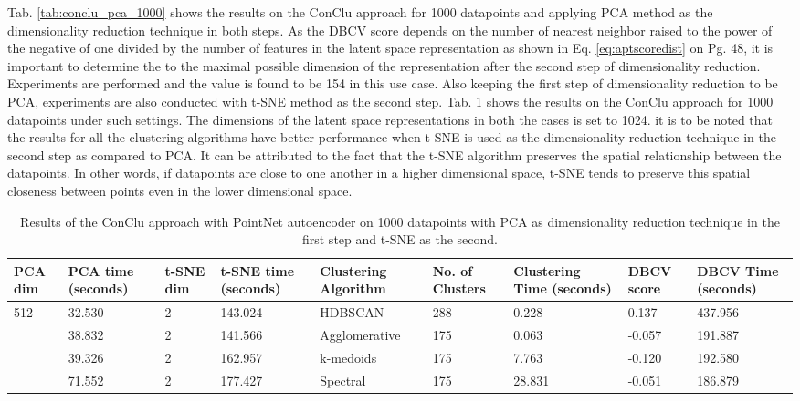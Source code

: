 Tab. \ref{tab:conclu_pca_1000} shows the results on the ConClu approach for 1000 datapoints and applying \ac{PCA} method as the dimensionality reduction technique in both steps. As the \ac{DBCV} score depends on the number of nearest neighbor raised to the power of the negative of one divided by the number of features in the latent space representation as shown in Eq. \ref{eq:aptscoredist} on Pg. 48, it is important to determine the to the maximal possible dimension of the representation after the second step of dimensionality reduction. Experiments are performed and the value is found to be 154 in this use case. Also keeping the first step of dimensionality reduction to be \ac{PCA}, experiments are also conducted with \ac{t-SNE} method as the second step. Tab. \ref{tab:conclu_tsne_1000} shows the results on the ConClu approach for 1000 datapoints under such settings. The dimensions of the latent space representations in both the cases is set to 1024. it is to be noted that the results for all the clustering algorithms have better performance when \ac{t-SNE} is used as the dimensionality reduction technique in the second step as compared to \ac{PCA}. It can be attributed to the fact that the \ac{t-SNE} algorithm preserves the spatial relationship between the datapoints. In other words, if datapoints are close to one another in a higher dimensional space, \ac{t-SNE} tends to preserve this spatial closeness between points even in the lower dimensional space. 

\begin{table}[H]
  \setlength\extrarowheight{10pt}
  \caption{Results of the ConClu approach with PointNet autoencoder on 1000 datapoints with \ac{PCA} as dimensionality reduction technique in the first step and \ac{t-SNE} as the second. }
  \centering
  \begin{tabular}{|p{30pt}|p{30pt}|p{30pt}|p{30pt}|p{60pt}|p{30pt}|p{40pt}|p{30pt}|p{30pt}|}
    \toprule
    \ac{PCA} dim & \ac{PCA} time (seconds) & \ac{t-SNE} dim	& \ac{t-SNE} time (seconds) & Clustering Algorithm & No. of Clusters & Clustering Time (seconds) & \ac{DBCV} score & \ac{DBCV} Time (seconds)\\
    \midrule
    \multirow{4}{30pt}{512}	& 32.530 & 2	& 143.024 & \ac{HDBSCAN}	& 288	& 0.228 & 0.137	& 437.956 \\ \cline{2-9} 
                              & 38.832 & 2	& 141.566 & Agglomerative & 175	& 0.063 & -0.057 & 191.887 \\ \cline{2-9} 
                              & 39.326 & 2	& 162.957 & k-medoids	& 175	& 7.763 & -0.120 	& 192.580 \\ \cline{2-9}
                              & 71.552 & 2	& 177.427 & Spectral	& 175	& 28.831 & -0.051	& 186.879 \\ 
    \bottomrule
  \end{tabular}
  \label{tab:conclu_tsne_1000}
\end{table}


